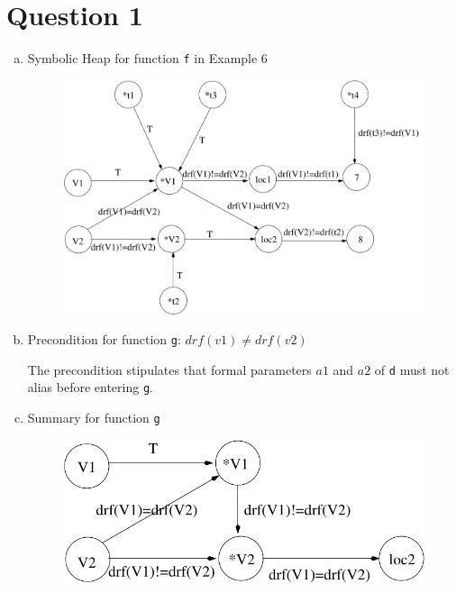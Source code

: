 \section*{Question 1}

\begin{enumerate}[(a)]
\item Symbolic Heap for function \texttt{f} in Example 6

\begin{figure}[!ht]
\centering
\includegraphics[scale=0.8]{q1-heap.pdf}
\label{fig:symheap}
\end{figure}

\item Precondition for function \texttt{g}: $\mathit{drf}(v1) \neq \mathit{drf}(v2) $

The precondition stipulates that formal parameters $a1$ and
$a2$ of \texttt{d} must not alias before entering \texttt{g}.

\item Summary for function \texttt{g}

\begin{figure}[!ht]
\centering
\includegraphics[scale=0.8]{q1-sum.pdf}
\label{fig:symheap}
\end{figure}

\end{enumerate}